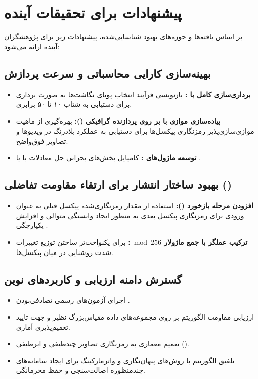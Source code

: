 \section{پیشنهادات برای تحقیقات آینده}

بر اساس یافته‌ها و حوزه‌های بهبود شناسایی‌شده، پیشنهادات زیر برای پژوهشگران آینده ارائه می‌شود:

\subsection{بهینه‌سازی کارایی محاسباتی و سرعت پردازش}
\begin{itemize}
    \item \textbf{برداری‌سازی کامل با :} بازنویسی فرآیند انتخاب پویای نگاشت‌ها به صورت برداری برای دستیابی به شتاب ۱۰ تا ۵۰ برابری.
    \item \textbf{پیاده‌سازی موازی با  بر روی پردازنده گرافیکی ():} بهره‌گیری از ماهیت موازی‌سازی‌پذیر رمزنگاری پیکسل‌ها برای دستیابی به عملکرد بلادرنگ در ویدیوها و تصاویر فوق‌واضح.
    \item \textbf{توسعه ماژول‌های :} کامپایل بخش‌های بحرانی حل معادلات با  یا .
\end{itemize}

\subsection{بهبود ساختار انتشار برای ارتقاء مقاومت تفاضلی ()}
\begin{itemize}
    \item \textbf{افزودن مرحله بازخورد ():} استفاده از مقدار رمزنگاری‌شده پیکسل قبلی به عنوان ورودی برای رمزنگاری پیکسل بعدی به منظور ایجاد وابستگی متوالی و افزایش یکپارچگی .
    \item \textbf{ترکیب عملگر  با جمع ماژولار $\bmod 256$:} برای یکنواخت‌تر ساختن توزیع تغییرات شدت روشنایی در میان پیکسل‌ها.
\end{itemize}

\subsection{گسترش دامنه ارزیابی و کاربردهای نوین}
\begin{itemize}
    \item اجرای آزمون‌های رسمی تصادفی‌بودن .
    \item ارزیابی مقاومت الگوریتم بر روی مجموعه‌های داده مقیاس‌بزرگ نظیر  و  جهت تایید تعمیم‌پذیری آماری.
    \item تعمیم معماری به رمزنگاری تصاویر چندطیفی و ابرطیفی ().
    \item تلفیق الگوریتم با روش‌های پنهان‌نگاری و واترمارکینگ برای ایجاد سامانه‌های چندمنظوره اصالت‌سنجی و حفظ محرمانگی.
\end{itemize}

